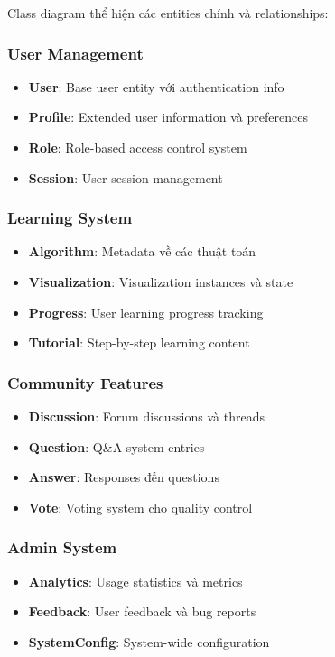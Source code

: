 \documentclass[12pt,a4paper]{article}
\begin{document}
Class diagram thể hiện các entities chính và relationships:

\subsubsection{User Management}
\begin{itemize}
    \item \textbf{User}: Base user entity với authentication info
    \item \textbf{Profile}: Extended user information và preferences
    \item \textbf{Role}: Role-based access control system
    \item \textbf{Session}: User session management
\end{itemize}

\subsubsection{Learning System}
\begin{itemize}
    \item \textbf{Algorithm}: Metadata về các thuật toán
    \item \textbf{Visualization}: Visualization instances và state
    \item \textbf{Progress}: User learning progress tracking
    \item \textbf{Tutorial}: Step-by-step learning content
\end{itemize}

\subsubsection{Community Features}
\begin{itemize}
    \item \textbf{Discussion}: Forum discussions và threads
    \item \textbf{Question}: Q\&A system entries
    \item \textbf{Answer}: Responses đến questions
    \item \textbf{Vote}: Voting system cho quality control
\end{itemize}

\subsubsection{Admin System}
\begin{itemize}
    \item \textbf{Analytics}: Usage statistics và metrics
    \item \textbf{Feedback}: User feedback và bug reports
    \item \textbf{SystemConfig}: System-wide configuration
\end{itemize}
\end{document}
